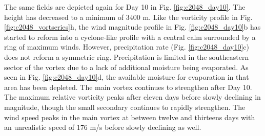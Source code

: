    The same fields are depicted
   again for Day 10 in Fig. \ref{fig:c2048_day10}. The height has decreased to a minimum of $3400$ m.
   Like the vorticity profile in Fig. \ref{fig:c2048_vortseries}h, the wind magnitude profile in 
   Fig. \ref{fig:c2048_day10}b has started to reform into a cyclone-like profile with a central calm
   surrounded by a ring of maximum winds. However, precipitation rate 
   (Fig. \ref{fig:c2048_day10}c) does not reform a symmetric ring. Precipitation is limited
   in the southeastern sector of the vortex due to a lack of additional moisture
   being evaporated. As seen in Fig. \ref{fig:c2048_day10}d, the available moisture
   for evaporation in that area has been depleted. The main vortex continues to strengthen 
   after Day 10. The maximum relative vorticity peaks after eleven days before slowly
   declining in magnitude, though the small secondary continues to rapidly strengthen. 
   The wind speed peaks in the main vortex at between twelve and thirteens days with an unrealistic
   speed of $176$ m/s before slowly declining as well.
   
           
